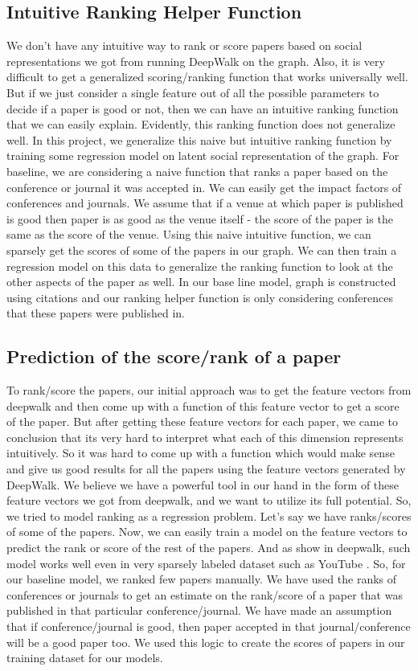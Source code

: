 \documentclass[a4paper, 11pt]{article}
\begin{document}
\subsection{Intuitive Ranking Helper Function}
We don't have any intuitive way to rank or score papers based on social representations we got from running DeepWalk on the graph. Also, it is very difficult to get a generalized scoring/ranking function that works universally well. But if we just consider a single feature out of all the possible parameters to decide if a paper is good or not, then we can have an intuitive ranking function that we can easily explain. Evidently, this ranking function does not generalize well. In this project,  we generalize this naive but intuitive ranking function by training some regression model on latent social representation of the graph. For baseline, we are considering a naive function that ranks a paper based on the conference or journal it was accepted in.  We can easily get the impact factors of conferences and journals. We assume that if a venue at which paper is published is good then paper is as good as the venue itself - the score of the paper is the same as the score of the venue. Using this naive intuitive function, we can sparsely get the scores of some of the papers in our graph. We can then train a regression model on this data to generalize the ranking function to look at the other aspects of the paper as well. In our base line model, graph is constructed using citations and our ranking helper function is only considering conferences that these papers were published in. 
\subsection{Prediction of the score/rank of a paper} 
To rank/score the papers, our initial approach was to get the feature vectors from deepwalk and then come up with a function of this feature vector to get a score of the paper. But after getting these feature vectors for each paper, we came to conclusion that its very hard to interpret what each of this dimension represents intuitively. So it was hard to come up with a function which would make sense and give us good results for all the papers using the feature vectors generated by DeepWalk. We believe we have a powerful tool in our hand in the form of these feature vectors we got from deepwalk, and we want to utilize its full potential. So, we tried to model ranking as a regression problem. Let's say we have ranks/scores of some of the papers. Now, we can easily train a model on the feature vectors to predict the rank or score of the rest of the papers. And as show in deepwalk, such model works well even in very sparsely labeled dataset such as YouTube \cite{deepwalk}.  So, for our baseline model, we ranked few papers manually.  We have used the ranks of conferences or journals to get an estimate on the rank/score of a paper that was published in that particular conference/journal. We have made an assumption that if conference/journal is good, then paper accepted in that journal/conference will be a good paper too. We used this logic to create the scores of papers in our training dataset for our models.
\end{document}
